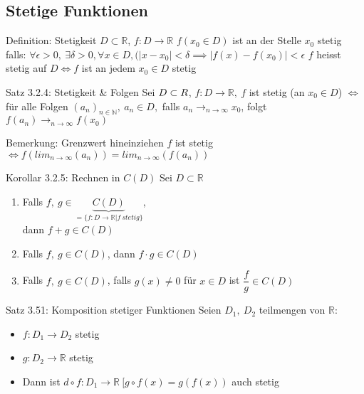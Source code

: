 \documentclass[a4paper,10pt]{article}
\def\R{\mathbb{R}}
\begin{document}
\subsection{Stetige Funktionen}
\begin{defbox}
    {Definition: Stetigkeit}
    $D\subset \mathbb R$, $f:D\longrightarrow\mathbb R$
    $f(x_0\in D)$ ist an der Stelle $x_0$ stetig falls: $\forall \epsilon>0,\ \exists \delta>0, \forall x \in D, (|x-x_0|<\delta \implies |f(x)-f(x_0)|<\epsilon$
    $f$ heisst stetig auf $D\iff f$ ist an jedem $x_0\in D$ stetig
\end{defbox}
\begin{tbox}
    {Satz 3.2.4: Stetigkeit \& Folgen}
    Sei $ D\subset \mathbb \R$, $f: D\longrightarrow \mathbb R,\ f $ ist stetig (an $x_0 \in D$) $\iff$ für alle Folgen $(a_n)_{n\in\mathbb N},\ a_n\in D,$ falls $a_n\longrightarrow_{n\to \infty}x_0$, folgt $f(a_n)\longrightarrow_{n\to\infty} f(x_0)$
\end{tbox}
\begin{bembox}
    {Bemerkung: Grenzwert hineinziehen}
    $f$ ist stetig
    \\$\iff f(lim_{n\rightarrow\infty}(a_n))=lim_{n\rightarrow\infty}(f(a_n))$
\end{bembox}
\begin{tbox}
    {Korollar 3.2.5: Rechnen in $C(D)$}
    Sei $D\subset \mathbb R$
    \begin{enumerate}
        \item Falls $f,\ g \in \underbrace{C(D)}_{=\{f:D\to\mathbb R|f\ stetig\}}$, 
        \\dann $f+g \in C(D)$
        \item Falls $f,\ g \in C(D)$, dann $f\cdot g \in C(D)$
        \item Falls $f,\ g \in C(D)$, falls $ g(x)\neq 0$ für $x\in D$ ist $\dfrac{f}g \in C(D)$
    \end{enumerate}
\end{tbox}
\begin{tbox}
    {Satz 3.51: Komposition stetiger Funktionen}
    Seien $D_1,\ D_2$ teilmengen von $\mathbb R$:
    \begin{itemize}
        \item $f: D_1\longrightarrow D_2$ stetig
        \item $g: D_2\longrightarrow \mathbb R$ stetig
        \item Dann ist $ d\circ f: D_1\longrightarrow \mathbb R \ [g\circ f(x)=g(f(x))$ auch stetig
    \end{itemize}
\end{tbox}
\end{document}
